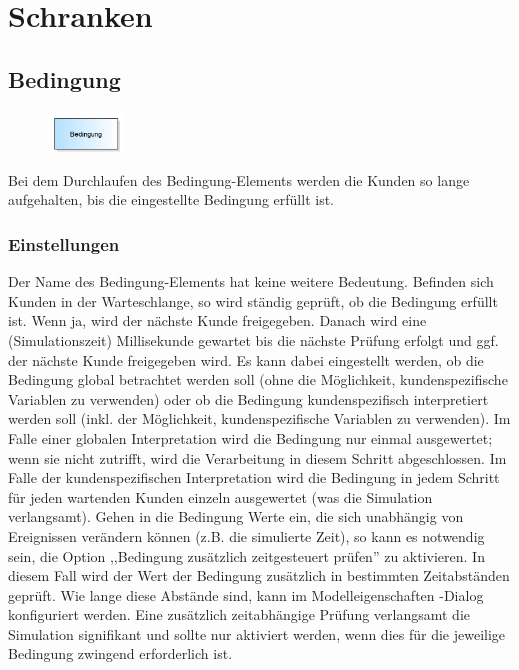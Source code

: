 \chapter{Schranken}

\section{Bedingung}
\label{ref:ModelElementHold}

\begin{figure}
\vspace{-22pt}
\includegraphics[width=2cm]{imageModelElementHold.png}
\vspace{-22pt}
\end{figure}

Bei dem Durchlaufen des Bedingung-Elements werden die Kunden so lange aufgehalten, bis die eingestellte Bedingung erfüllt ist. 

\subsection*{Einstellungen}

Der Name des Bedingung-Elements hat keine weitere Bedeutung. Befinden sich Kunden in der Warteschlange, so wird ständig geprüft,
ob die Bedingung erfüllt ist. Wenn ja, wird der nächste Kunde freigegeben. Danach wird eine (Simulationszeit) Millisekunde gewartet bis die nächste
Prüfung erfolgt und ggf. der nächste Kunde freigegeben wird. Es kann dabei eingestellt werden, ob die Bedingung global betrachtet werden soll
(ohne die Möglichkeit, kundenspezifische Variablen zu verwenden) oder ob die Bedingung kundenspezifisch interpretiert werden soll (inkl. der
Möglichkeit, kundenspezifische Variablen zu verwenden). Im Falle einer globalen Interpretation wird die Bedingung nur einmal ausgewertet; wenn
sie nicht zutrifft, wird die Verarbeitung in diesem Schritt abgeschlossen. Im Falle der kundenspezifischen Interpretation wird die Bedingung
in jedem Schritt für jeden wartenden Kunden einzeln ausgewertet (was die Simulation verlangsamt).
Gehen in die Bedingung Werte ein, die sich unabhängig von Ereignissen verändern können (z.B. die simulierte Zeit), so kann es notwendig sein,
die Option ,,Bedingung zusätzlich zeitgesteuert prüfen'' zu aktivieren. In diesem Fall wird der Wert der Bedingung zusätzlich in bestimmten
Zeitabständen geprüft. Wie lange diese Abstände sind, kann im Modelleigenschaften -Dialog konfiguriert
werden. Eine zusätzlich zeitabhängige Prüfung verlangsamt die Simulation signifikant und sollte nur aktiviert werden, wenn dies für die
jeweilige Bedingung zwingend erforderlich ist. 


